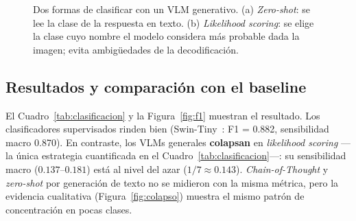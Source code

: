 \documentclass[11pt, a4paper]{article}
\begin{document}
\begin{figure}[H]
\centering
{}
\caption{Dos formas de clasificar con un VLM generativo. (a) \emph{Zero-shot}: se lee la clase de la
respuesta en texto. (b) \emph{Likelihood scoring}: se elige la clase cuyo nombre el modelo considera más
probable dada la imagen; evita ambigüedades de la decodificación.}
\label{fig:zsvslik}
\end{figure}

\subsection{Resultados y comparación con el baseline}
El Cuadro~\ref{tab:clasificacion} y la Figura~\ref{fig:f1} muestran el resultado. Los clasificadores
supervisados rinden bien (Swin-Tiny~\cite{liu2021swin}: F1 = 0.882, sensibilidad macro 0.870). En
contraste, los VLMs generales \textbf{colapsan} en \emph{likelihood scoring} —la única estrategia
cuantificada en el Cuadro~\ref{tab:clasificacion}—: su sensibilidad macro ($0.137$--$0.181$) está al nivel
del azar ($1/7 \approx 0.143$). \emph{Chain-of-Thought} y \emph{zero-shot} por generación de texto no se
midieron con la misma métrica, pero la evidencia cualitativa (Figura~\ref{fig:colapso}) muestra el mismo
patrón de concentración en pocas clases.
\end{document}
